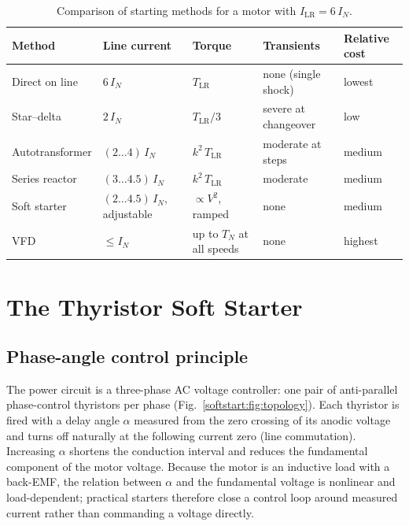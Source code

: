 \begin{table}[htb]
\centering
\caption{Comparison of starting methods for a motor with
$I_\mathrm{LR} = 6\,I_N$.}
\label{softstart:tab:methods}
\begin{tabular}{@{}lllll@{}}
\toprule
Method & Line current & Torque & Transients & Relative cost \\
\midrule
Direct on line      & $6\,I_N$            & $T_\mathrm{LR}$        & none (single shock) & lowest \\
Star--delta         & $2\,I_N$            & $T_\mathrm{LR}/3$      & severe at changeover & low \\
Autotransformer     & $(2\ldots4)\,I_N$   & $k^2\,T_\mathrm{LR}$   & moderate at steps    & medium \\
Series reactor      & $(3\ldots4.5)\,I_N$ & $k^2\,T_\mathrm{LR}$   & moderate             & medium \\
Soft starter        & $(2\ldots4.5)\,I_N$, adjustable & $\propto V^2$, ramped & none & medium \\
VFD                 & $\leq I_N$          & up to $T_N$ at all speeds & none & highest \\
\bottomrule
\end{tabular}
\end{table}

\section{The Thyristor Soft Starter}

\subsection{Phase-angle control principle}

The power circuit is a three-phase AC voltage controller: one pair of
anti-parallel phase-control thyristors per phase
(Fig.~\ref{softstart:fig:topology}). Each thyristor is fired with a delay angle
$\alpha$ measured from the zero crossing of its anodic voltage and turns off
naturally at the following current zero (line commutation). Increasing
$\alpha$ shortens the conduction interval and reduces the fundamental
component of the motor voltage. Because the motor is an inductive load with a
back-EMF, the relation between $\alpha$ and the fundamental voltage is
nonlinear and load-dependent; practical starters therefore close a control
loop around measured current rather than commanding a voltage directly.

